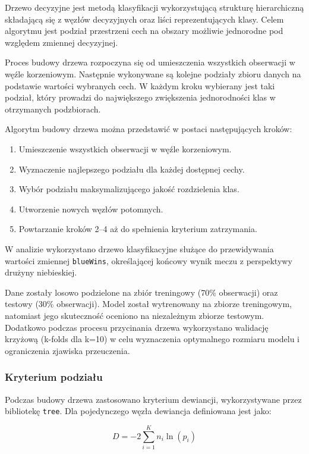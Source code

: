 \documentclass[twoside]{customStyle}
\begin{document}
Drzewo decyzyjne \cite{TREE} jest metodą klasyfikacji wykorzystującą strukturę hierarchiczną składającą się z węzłów decyzyjnych oraz liści reprezentujących klasy. Celem algorytmu jest podział przestrzeni cech na obszary możliwie jednorodne pod względem zmiennej decyzyjnej.

Proces budowy drzewa rozpoczyna się od umieszczenia wszystkich obserwacji w węźle korzeniowym. Następnie wykonywane są kolejne podziały zbioru danych na podstawie wartości wybranych cech. W każdym kroku wybierany jest taki podział, który prowadzi do największego zwiększenia jednorodności klas w otrzymanych podzbiorach.

Algorytm budowy drzewa można przedstawić w postaci następujących kroków:

\begin{enumerate}
    \item Umieszczenie wszystkich obserwacji w węźle korzeniowym.
    \item Wyznaczenie najlepszego podziału dla każdej dostępnej cechy.
    \item Wybór podziału maksymalizującego jakość rozdzielenia klas.
    \item Utworzenie nowych węzłów potomnych.
    \item Powtarzanie kroków 2--4 aż do spełnienia kryterium zatrzymania.
\end{enumerate}

W analizie wykorzystano drzewo klasyfikacyjne służące do przewidywania wartości zmiennej \texttt{blueWins}, określającej końcowy wynik meczu z perspektywy drużyny niebieskiej.

Dane zostały losowo podzielone na zbiór treningowy (70\% obserwacji) oraz testowy (30\% obserwacji). Model został wytrenowany na zbiorze treningowym, natomiast jego skuteczność oceniono na niezależnym zbiorze testowym. Dodatkowo podczas procesu przycinania drzewa wykorzystano walidację krzyżową (k-folds dla k=10) w celu wyznaczenia optymalnego rozmiaru modelu i ograniczenia zjawiska przeuczenia.


\subsubsection{Kryterium podziału}

Podczas budowy drzewa zastosowano kryterium dewiancji, wykorzystywane przez bibliotekę \texttt{tree}. Dla pojedynczego węzła dewiancja definiowana jest jako:

\begin{equation}
D = -2 \sum_{i=1}^{K} n_i \ln(p_i)
\end{equation}
\end{document}
